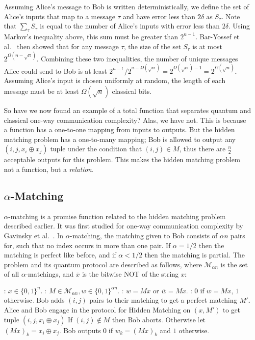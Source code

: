 \documentclass[a4paper]{article}
\begin{document}
        Assuming Alice's message to Bob is written deterministically, we define the set of Alice's inputs that map to a message $\tau$ and have error less than $2\delta$ as $S_{\tau}$. Note that $\sum_{\tau}S_{\tau}$ is equal to the number of Alice's inputs with error less than $2\delta$. Using Markov's inequality above, this sum must be greater than $2^{n-1}$. Bar-Yossef et al.~ then showed that for any message $\tau$, the size of the set $S_{\tau}$ is at most $2^{\Omega(n - \sqrt{n})}$. Combining these two inequalities, the number of unique messages Alice could send to Bob is at least $2^{n - 1}/2^{n - \Omega(\sqrt{n})} = 2^{\Omega(\sqrt{n}) - 1} = 2^{\Omega(\sqrt{n})}$. Assuming Alice's input is chosen uniformly at random, the length of each message must be at least $\Omega(\sqrt{n})$ classical bits.

        So have we now found an example of a total function that separates quantum and classical one-way communication complexity? Alas, we have not. This is because a function has a one-to-one mapping from inputs to outputs. But the hidden matching problem has a one-to-many mapping; Bob is allowed to output any $(i, j, x_i \oplus x_j)$ tuple under the condition that $(i, j) \in M$, thus there are $\frac{n}{2}$ acceptable outputs for this problem. This makes the hidden matching problem not a function, but a {\em relation}.

        \subsection{$\alpha$-Matching}

        $\alpha$-matching is a promise function related to the hidden matching problem described earlier. It was first studied for one-way communication complexity by Gavinsky et al.~\cite{Gavinsky:2007:ESO:1250790.1250866}. In $\alpha$-matching, the matching given to Bob consists of $\alpha n$ pairs for, such that no index occurs in more than one pair. If $\alpha = 1/2$ then the matching is perfect like before, and if $\alpha < 1/2$ then the matching is partial. The problem and its quantum protocol are described as follows, where $\mathcal{M}_{\alpha n}$ is the set of all $\alpha$-matchings, and $\bar{x}$ is the bitwise NOT of the string $x$:

        \begin{codebox}
            \zi {}: $x \in \{0,1\}^n$.
            \zi {}: $M \in \mathcal{M}_{\alpha n}, w \in \{0, 1\}^{\alpha n}$.
            \zi {}: $w = Mx$ or $\bar{w} = Mx$.
            \zi {}: $0$ if $w = Mx$, $1$ otherwise.
            \li Bob adds $(i, j)$ pairs to their matching to get a perfect matching $M'$.
            \li Alice and Bob engage in the protocol for Hidden Matching on $(x, M')$ to get tuple $(i, j, x_i \oplus x_j)$
            \li If $(i, j) \notin M$ then Bob aborts. Otherwise let $(Mx)_k = x_i \oplus x_j$.
            \li Bob outputs $0$ if $w_k = (Mx)_k$ and $1$ otherwise.
        \end{codebox}
\end{document}
